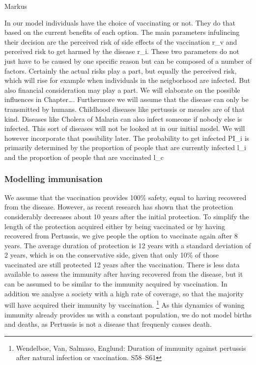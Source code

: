 \documentclass[11pt]{article}
\begin{document}
Markus
\vspace{14px}

In our model individuals have the choice of vaccinating or not. They do that based on the current benefits of each option. The main parameters infulincing their decision are the perceived risk of side effects of the vaccination r\_v and perceived risk to get harmed by the disease r\_i. 
These two parameters do not just have to be caused by one specific reason but can be composed of a number of factors. Certainly the actual risks play a part, but equally the perceived risk, which will rise for example when individuals in the neigborhood are infected. But also financial consideration may play a part. We will elaborate on the possible influences in Chapter….
Furthermore we will assume that the disease can only be transmitted by humans. Childhood diseases like pertussis or measles are of that kind. Diseases like Cholera of Malaria can also infect someone if nobody else is infected. This sort of diseases will not be looked at in our initial model. We will however incorporate that possibility later. 
The probability to get infected PI\_i is primarily determined by the proportion of people that are currently infected l\_i and the proportion of people that are vaccinated l\_c


\subsubsection{Modelling immunisation}
We assume that the vaccination provides 100\% safety, equal to having recovered from the disease. However, as recent research has shown that the protection considerably decreases about 10  years after the initial protection. 
To simplify the length of the protection acquired either by being vaccinated or by having recovered from Pertussis, we give people the option to vaccinate again after 8 years. The average duration of protection is 12 years with a standard deviation of 2 years, which is on the conservative side, given that only 10\% of those vaccinated are still protected 12 years after the vaccination. There is less data available to assess the immunity after having recovered from the disease, but it can be assumed to be similar to the immunity acquired by vaccination. In addition we analyse a society with a high rate of coverage, so that the majority will have acquired their immunity by vaccination. \footnote{Wendelboe, Van, Salmaso, Englund: Duration of immunity against pertussis after natural infection or vaccination. S58–S61} 
As this dynamics of waning immunity already provides us with a constant population, we do not model births and deaths, as Pertussis is not a disease that frequenly causes death. 
\end{document}
